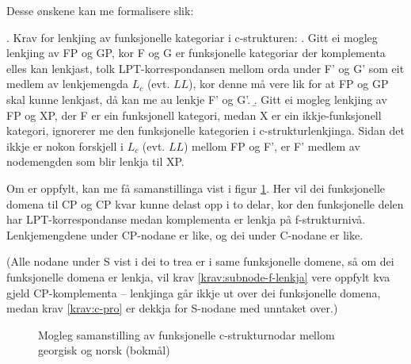 \documentclass[11pt,a4paper,oneside,draft]{report}
\begin{document}
Desse ønskene kan me formalisere slik:

\ex. \label{fnordkrav} Krav for lenkjing av funksjonelle kategoriar i c-strukturen:
\a. Gitt ei mogleg lenkjing av FP og GP, kor F og G er funksjonelle
    kategoriar der komplementa elles kan lenkjast,
    tolk LPT-korrespondansen mellom orda under F' og G' som eit
    medlem av lenkjemengda $L_c$ (evt. $LL$), kor denne må vere lik
    for at FP og GP skal kunne lenkjast, då kan me au lenkje F' og G'.
\b. Gitt ei mogleg lenkjing av FP og XP, der F er ein funksjonell
    kategori, medan X er ein ikkje-funksjonell kategori, ignorerer me
    den funksjonelle kategorien i c-strukturlenkjinga. Sidan det ikkje
    er nokon forskjell i $L_c$ (evt. $LL$) mellom FP og F', er F' medlem
    av nodemengden som blir lenkja til XP.

Om \Last[a] er oppfylt, kan me få samanstillinga vist i figur
\ref{fig:fnord}. Her vil dei funksjonelle domena til CP og CP
kvar kunne delast opp i to delar, kor den funksjonelle delen har
LPT-korrespondanse medan komplementa er lenkja på
f-strukturnivå. Lenkjemengdene under CP-nodane er like, og dei under
C-nodane er like.

(Alle nodane under S vist i dei to trea er i same funksjonelle domene,
så om dei funksjonelle domena er lenkja, vil krav
\ref{krav:subnode-f-lenkja} vere oppfylt kva gjeld CP-komplementa --
lenkjinga går ikkje ut over dei funksjonelle domena, medan
krav \ref{krav:c-pro} er dekkja for S-nodane med unntaket over.)

  \begin{figure}[htp]
   \centering
  
  \caption{Mogleg samanstilling av funksjonelle c-strukturnodar mellom georgisk og norsk (bokmål)}
   \label{fig:fnord}
  \end{figure}
\end{document}
